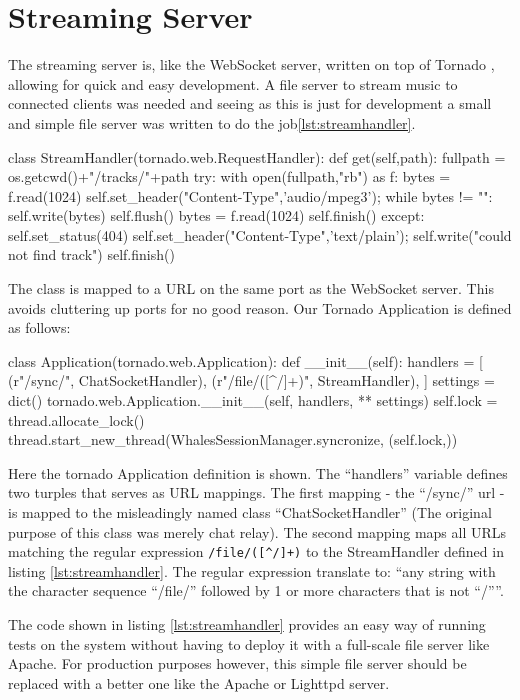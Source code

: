 \section{Streaming Server}

The streaming server is, like the WebSocket server, written on top of Tornado
\cite{tornadoweb11}, allowing for quick and easy development.
A file server to stream music to connected clients was needed and seeing as this is just
for development a small and simple file server was written to do the
job\ref{lst:streamhandler}.

\begin{snippet}[language=Python,label=lst:streamhandler,caption=The streaming server] 
class StreamHandler(tornado.web.RequestHandler):
    def get(self,path):
        fullpath = os.getcwd()+"/tracks/"+path
        try:
            with open(fullpath,"rb") as f:
                bytes = f.read(1024)
                self.set_header("Content-Type",'audio/mpeg3');
                while bytes != "":
                    self.write(bytes)
                    self.flush()
                    bytes = f.read(1024)
            self.finish()
        except:
            self.set_status(404)
            self.set_header("Content-Type",'text/plain');
            self.write("could not find track")
            self.finish()
\end{snippet}

The class is mapped to a URL on the same port as the WebSocket server. This
avoids cluttering up ports for no good reason. Our Tornado Application is
defined as follows:

\begin{snippet}[language=Python,caption=The streaming server]
class Application(tornado.web.Application):
    def __init__(self):
        handlers = [
            (r"/sync/", ChatSocketHandler),
            (r"/file/([^/]+)", StreamHandler),
        ]
        settings = dict()
        tornado.web.Application.__init__(self, handlers, ** settings)
        self.lock = thread.allocate_lock()
        thread.start_new_thread(WhalesSessionManager.syncronize, (self.lock,))
\end{snippet}

Here the tornado Application definition is shown. The ``handlers'' variable
defines two turples that serves as URL mappings. The first mapping - the
``/sync/'' url - is mapped to the misleadingly named class
``ChatSocketHandler'' (The original purpose of this class was merely chat
relay). The second mapping maps all URLs matching the regular expression
\verb$/file/([^/]+)$ to the StreamHandler defined in listing 
\ref{lst:streamhandler}. The regular expression translate to: ``any string 
with the character sequence ``/file/'' followed by 1 or more characters that is 
not ``/''''.


The code shown in listing \ref{lst:streamhandler} provides an easy way of 
running tests on the system without having to deploy it with a full-scale file
server like Apache. For production purposes however, this simple file server
should be replaced with a better one like the Apache or Lighttpd server.